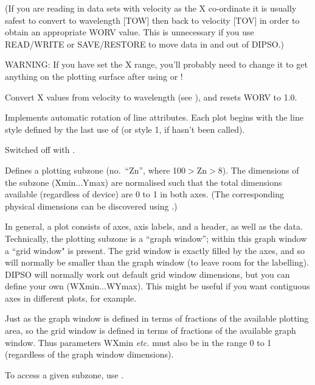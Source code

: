 \begin {description}
(If you are reading in data sets with velocity as the X co-ordinate it
is usually safest to convert to wavelength [TOW] then back to velocity
[TOV] in order to obtain an appropriate WORV value. This is
unnecessary if you use READ/WRITE or SAVE/RESTORE to move data in and
out of DIPSO.)

WARNING: If you have set the X range, you'll probably need to change
it to get anything on the plotting surface after using   or ! 

Convert X values from velocity to wavelength (see ),  and resets
WORV to 1.0.

Implements automatic rotation of line attributes. Each plot begins
with the line style defined by the last use of   (or style 1, if
  hasn't been called).

Switched off with . 

Defines a plotting subzone (no.\ ``Zn'', where 100$>$Zn$>$8). The
dimensions of the subzone (Xmin...Ymax) are normalised such that the
total dimensions available (regardless of device) are 0 to 1 in both
axes. (The corresponding physical dimensions can be discovered using
.) 

In general, a plot consists of axes, axis labels, and a header, as
well as the data. Technically, the plotting subzone is a ``graph
window''; within this graph window a ``grid window" is present. The
grid window is exactly filled by the axes, and so will normally be
smaller than the graph window (to leave room for the labelling). DIPSO
will normally work out default grid window dimensions, but you can
define your own (WXmin...WYmax). This might be useful if you want
contiguous axes in different plots, for example.

Just as the graph window is defined in terms of fractions of the
available plotting area, so the grid window is defined in terms of
fractions of the available graph window. Thus parameters WXmin {\em
etc.} must also be in the range 0 to 1 (regardless of the graph window
dimensions).

To access a given subzone, use . 


\end{description}
